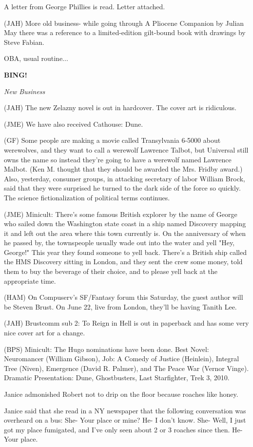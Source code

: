 \documentclass[12pt]{article}
\newcommand{\bing}{{\bf BING!} }
\newcommand{\goto}[1]{\bing \vskip 12pt \centerline{{\em{#1}}}}
\begin{document}
A letter from George Phillies is read. Letter attached.

(JAH) More old business- while going through A Pliocene Companion by Julian May there was a reference to a limited-edition gilt-bound book with drawings by Steve Fabian.

OBA, usual routine...

\goto{New Business}

(JAH) The new Zelazny novel is out in hardcover. The cover art is ridiculous.

(JME) We have also received Cathouse: Dune.

(GF) Some people are making a movie called Transylvania 6-5000 about werewolves, and they want to call a werewolf Lawrence Talbot, but Universal still owns the name so instead they're going to have a werewolf named Lawrence Malbot. (Ken M. thought that they should be awarded the Mrs. Fridby award.) Also, yesterday, consumer groups, in attacking secretary of labor William Brock, said that they were surprised he turned to the dark side of the force so quickly. The science fictionalization of political terms continues.

(JME) Minicult: There's some famous British explorer by the name of George who sailed down the Washington state coast in a ship named Discovery mapping it and left out the area where this town currently is. On the anniversary of when he passed by, the townspeople usually wade out into the water and yell "Hey, George!" This year they found someone to yell back. There's a British ship called the HMS Discovery sitting in London, and they sent the crew some money, told them to buy the beverage of their choice, and to please yell back at the appropriate time.

(HAM) On Compuserv's SF/Fantasy forum this Saturday, the guest author will be Steven Brust. On June 22, live from London, they'll be having Tanith Lee.

(JAH) Brustcomm sub 2: To Reign in Hell is out in paperback and has some very nice cover art for a change.

(BPS) Minicult: The Hugo nominations have been done. Best Novel: Neuromancer (William Gibson), Job: A Comedy of Justice (Heinlein), Integral Tree (Niven), Emergence (David R. Palmer), and The Peace War (Vernor Vinge). Dramatic Presentation: Dune, Ghostbusters, Last Starfighter, Trek 3, 2010.

Janice admonished Robert not to drip on the floor because roaches like honey.

Janice said that she read in a NY newspaper that the following conversation was overheard on a bus: She- Your place or mine? He- I don't know. She- Well, I just got my place fumigated, and I've only seen about 2 or 3 roaches since then. He- Your place.
\end{document}

